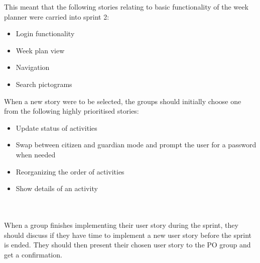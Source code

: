 This meant that the following stories relating to basic functionality of the week planner were carried into sprint 2:
\begin{itemize}
    \item Login functionality
    \item Week plan view
    \item Navigation
    \item Search pictograms
\end{itemize}
When a new story were to be selected, the groups should initially choose one from the following highly prioritised stories:
\begin{itemize}
    \item Update status of activities
    \item Swap between citizen and guardian mode and prompt the user for a password when needed
    \item Reorganizing the order of activities
    \item Show details of an activity
\end{itemize}
\\\\
When a group finishes implementing their user story during the sprint, they should discuss if they have time to implement a new user story before the sprint is ended. They should then present their chosen user story to the PO group and get a confirmation.
